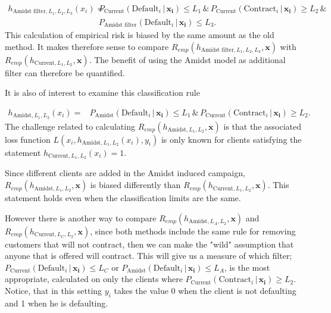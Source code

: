 \documentclass{article}
\theoremstyle{theorem}
\theoremstyle{definition}
\newcommand{\bv}[1]{\bm{#1}}
\begin{document}
\begin{equation}
\begin{split}
\label{eq:filter}
h_{\mbox{Amidst filter},L_1,L_2,L_3}(x_i) = &
P_{\mbox{Current}}(\mbox{Default}_i \,|\, \bv{x_i}) \leq L_1
 \, \& \,
P_{\mbox{Current}}(\mbox{Contract}_i \,|\, \bv{x_i}) \geq L_2
\, \& \,  
\\ &
P_{\mbox{Amidst filter}}(\mbox{Default}_i \,|\, \bv{x_i}) \leq L_3.
\end{split}
\end{equation}
This calculation of empirical risk is biased by the same amount as the old method.  It makes therefore sense to compare $R_{emp}(h_{\mbox{Amidst filter},L_1,L_2,L_3}, \bv{x}) $ with $R_{emp}(h_{\mbox{Current},L_1,L_2}, \bv{x}) $.
The benefit of using the Amidst model as additional filter can therefore be quantified.

It is also of interest to examine this classification rule

\begin{equation}
\begin{split}
\label{eq:amidst}
h_{\mbox{Amidst},L_1,L_2}(x_i) = &
P_{\mbox{Amidst}}(\mbox{Default}_i \,|\, \bv{x_i}) \leq L_1
 \, \& \,
P_{\mbox{Current}}(\mbox{Contract}_i \,|\, \bv{x_i}) \geq L_2.
\end{split}
\end{equation}
The challenge related to calculating $R_{emp}(h_{\mbox{Amidst},L_1,L_2}, \bv{x})$ is that the associated loss function 
$L(x_i, h_{\mbox{Amidst},L_1,L_2}(x_i) , y_i)$ is only known for clients satisfying the statement $h_{\mbox{Current},L_1,L_2}(x_i) = 1$.  

Since different clients are added in the Amidst induced campaign, $R_{emp}(h_{\mbox{Amidst},L_1,L_2}, \bv{x})$ is biased differently than $R_{emp}(h_{\mbox{Current},L_1,L_2}, \bv{x})$. This statement holds even when the classification limits are the same. 

However there is another way to compare $R_{emp}(h_{\mbox{Amidst},L_A,L_2}, \bv{x})$ and $R_{emp}(h_{\mbox{Current},L_C,L_2}, \bv{x})$, since both methods include the same rule for removing customers that will not contract, then we can make the "wild" assumption that anyone that is offered will contract.  This will give us a measure of which filter; $P_{\mbox{Current}}(\mbox{Default}_i \,|\, \bv{x_i}) \leq L_C$ or $P_{\mbox{Amidst}}(\mbox{Default}_i \,|\, \bv{x_i}) \leq L_A$, is the most appropriate, calculated on only the clients where $P_{\mbox{Current}}(\mbox{Contract}_i \,|\, \bv{x_i}) \geq L_2$.  Notice, that in this setting $y_i$ takes the value 0 when the client is not defaulting and 1 when he is defaulting.
\end{document}
